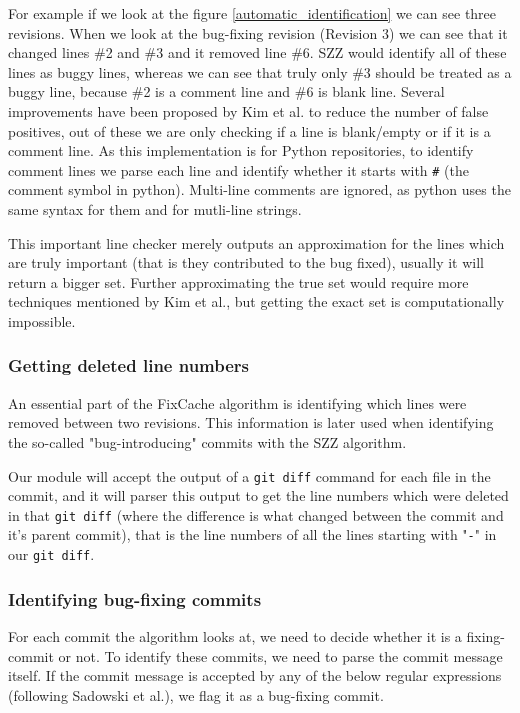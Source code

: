 \documentclass[12pt,twoside,notitlepage]{report}
\newcommand{\fxch}{FixCache}
\begin{document}
For example if we look at the figure \ref{automatic_identification} we can see three revisions. When we look at the bug-fixing revision (Revision 3) we can see that it changed lines \#2 and \#3 and it removed line \#6.
SZZ would identify all of these lines as buggy lines, whereas we can see that truly only \#3 should be treated as a buggy line, because \#2 is a comment line and \#6 is blank line.
Several improvements have been proposed by Kim et al. to reduce the number of false positives\cite{KimZim}, out of these we are only checking if a line is blank/empty or if it is a comment line. As this implementation is for Python repositories, to identify comment lines we parse each line and identify whether it starts with \texttt{\#} (the comment symbol in python). Multi-line comments are ignored, as python uses the same syntax for them and for mutli-line strings. 

This important line checker merely outputs an approximation for the lines which are truly important (that is they contributed to the bug fixed), usually it will return a bigger set. Further approximating the true set would require more techniques mentioned by Kim et al., but getting the exact set is computationally impossible\cite{KimZim}. 
\subsubsection*{Getting deleted line numbers}
An essential part of the \fxch{} algorithm is identifying which lines were removed between two revisions. This information is later used when identifying the so-called "bug-introducing" commits with the SZZ algorithm.

Our module will accept the output of a \texttt{git diff} command for each file in the commit, and it will parser this output to get the line numbers which were deleted in that \texttt{git diff} (where the difference is what changed between the commit and it's parent commit), that is the line numbers of all the lines starting with "\texttt{-}" in our \texttt{git diff}.
\subsubsection*{Identifying bug-fixing commits}
For each commit the algorithm looks at, we need to decide whether it is a fixing-commit or not. To identify these commits, we need to parse the commit message itself. If the commit message is accepted by any of the below regular expressions (following Sadowski et al.\cite{Sadowski}), we flag it as a bug-fixing commit. 
\end{document}

